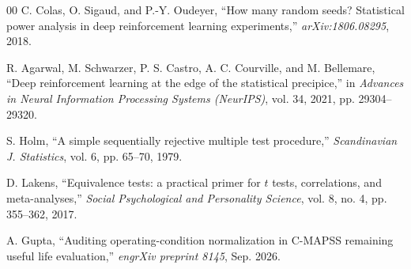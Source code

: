 \documentclass[conference]{IEEEtran}
\begin{document}
\begin{thebibliography}{00}
 C. Colas, O. Sigaud, and P.-Y. Oudeyer, ``How many random seeds? Statistical power analysis in deep reinforcement learning experiments,'' \emph{arXiv:1806.08295}, 2018.

 R. Agarwal, M. Schwarzer, P. S. Castro, A. C. Courville, and M. Bellemare, ``Deep reinforcement learning at the edge of the statistical precipice,'' in \emph{Advances in Neural Information Processing Systems (NeurIPS)}, vol. 34, 2021, pp. 29304--29320.

 S. Holm, ``A simple sequentially rejective multiple test procedure,'' \emph{Scandinavian J. Statistics}, vol. 6, pp. 65--70, 1979.

 D. Lakens, ``Equivalence tests: a practical primer for $t$ tests, correlations, and meta-analyses,'' \emph{Social Psychological and Personality Science}, vol. 8, no. 4, pp. 355--362, 2017.

 A. Gupta, ``Auditing operating-condition normalization in C-MAPSS remaining useful life evaluation,'' \emph{engrXiv preprint 8145}, Sep. 2026.

\end{thebibliography}
\end{document}
